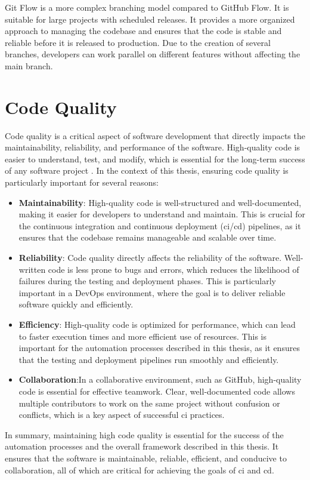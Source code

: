 Git Flow is a more complex branching model compared to GitHub Flow. It is suitable for large projects with scheduled releases. It provides a more organized 
approach to managing the codebase and ensures that the code is stable and reliable before it is released to production. Due to the creation of several branches, 
developers can work parallel on different features without affecting the main branch.

\section{Code Quality}
Code quality is a critical aspect of software development that directly impacts the maintainability, reliability, and performance of the software. High-quality 
code is easier to understand, test, and modify, which is essential for the long-term success of any software project \cite{6862882}. In the context of this thesis, ensuring 
code quality is particularly important for several reasons:

\begin{itemize}
    \item \textbf{Maintainability}:\newline 
    High-quality code is well-structured and well-documented, making it easier for developers to understand and maintain. This is crucial for the continuous 
    integration and continuous deployment (\acrshort{ci}/\acrshort{cd}) pipelines, as it ensures that the codebase remains manageable and scalable over time.
    \item \textbf{Reliability}:\newline 
    Code quality directly affects the reliability of the software. Well-written code is less prone to bugs and errors, which reduces the likelihood of failures 
    during the testing and deployment phases. This is particularly important in a DevOps environment, where the goal is to deliver reliable software quickly 
    and efficiently.
    \item \textbf{Efficiency}:\newline 
    High-quality code is optimized for performance, which can lead to faster execution times and more efficient use of resources. This is important for the 
    automation processes described in this thesis, as it ensures that the testing and deployment pipelines run smoothly and efficiently.
    \item \textbf{Collaboration}:\newline In a collaborative environment, such as GitHub, high-quality code is essential for effective teamwork. Clear, 
    well-documented code allows multiple contributors to work on the same project without confusion or conflicts, which is a key aspect of successful \acrshort{ci} 
    practices.
\end{itemize}

In summary, maintaining high code quality is essential for the success of the automation processes and the overall framework described in this thesis. It 
ensures that the software is maintainable, reliable, efficient, and conducive to collaboration, all of which are critical for achieving the goals of \acrlong{ci} 
and \acrlong{cd}.